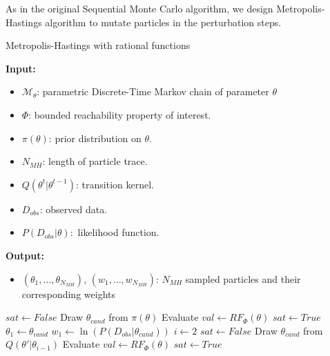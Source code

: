 \noindent As in the original Sequential Monte Carlo algorithm, we design Metropolis-Hastings algorithm to
mutate particles in the perturbation steps.
\begin{algorithm}[H]
    \caption{Metropolis-Hastings with rational functions}
    \label{alg:rf-mcmc}
    \footnotesize{
        \hspace*{\algorithmicindent} \textbf{Input:}
        \begin{itemize}[noitemsep,topsep=0pt]
            \item $\mathcal{M}_\theta$: parametric Discrete-Time Markov chain of parameter $\theta$
            \item $\Phi$: bounded reachability property of interest.
            \item $\pi(\theta)$: prior distribution on $\theta$.
            \item $N_{MH}$: length of particle trace.
            \item $Q(\theta^t|\theta^{t-1})$: transition kernel.
            \item $D_{obs}$: observed data.
            \item $P(D_{obs}|\theta):$ likelihood function.
        \end{itemize}
        \hspace*{\algorithmicindent} \textbf{Output:}
        \begin{itemize}[noitemsep,topsep=0pt]
            \item $(\theta_1,\ldots,\theta_{N_{MH}})$, $(w_1,\ldots,w_{N_{MH}})$: $N_{MH}$ sampled
                  particles and their corresponding weights
        \end{itemize}
    }
    \begin{algorithmic}[1]
        \State $sat \leftarrow False$
        \State Draw $\theta_{cand}$ from $\pi(\theta)$
        \State Evaluate $val \leftarrow RF_{\Phi}(\theta)$
        \State $sat \leftarrow True$
        \EndIf
        \EndWhile
        \State $\theta_1 \leftarrow  \theta_{cand}$
        \State $w_1 \leftarrow  \ln(P(D_{obs}|\theta_{cand}))$
        \State $i \leftarrow 2$
        \State $sat \leftarrow False $
        \State Draw $\theta_{cand}$ from $Q(\theta'|\theta_{i-1})$
        \State Evaluate $val \leftarrow RF_{\Phi}(\theta)$
        \State $sat \leftarrow True$
        \EndIf

\end{algorithmic}
\end{algorithm}
